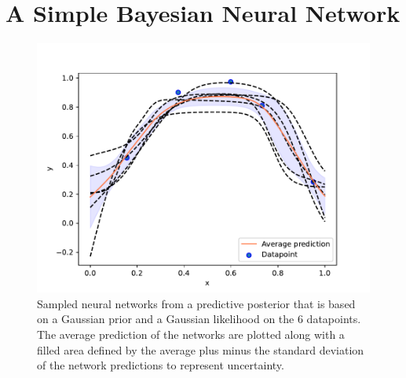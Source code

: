 \section{A Simple Bayesian Neural Network} \label{sec:simple_BNN}

\begin{figure}
    \centering
    \includegraphics[width=\textwidth,height=\textheight,keepaspectratio]{pics/figure_simple_BNN.pdf}
    \caption{Sampled neural networks from a predictive posterior that is based on a Gaussian prior and a Gaussian likelihood on the 6 datapoints. The average prediction of the networks are plotted along with a filled area defined by the average plus minus the standard deviation of the network predictions to represent uncertainty.}
    \label{fig:simple_BNN}
\end{figure}

